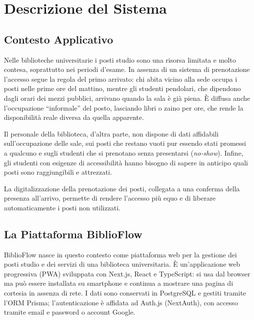 \documentclass[11pt,a4paper,oneside,openany]{book}
\begin{document}
\frontmatter
\copertina
\tableofcontents
\listoffigures

\mainmatter
\chapter{Descrizione del Sistema}

\section{Contesto Applicativo}

Nelle biblioteche universitarie i posti studio sono una risorsa limitata e
molto contesa, soprattutto nei periodi d'esame. In assenza di un sistema di
prenotazione l'accesso segue la regola del primo arrivato: chi abita vicino
alla sede occupa i posti nelle prime ore del mattino, mentre gli studenti
pendolari, che dipendono dagli orari dei mezzi pubblici, arrivano quando la sala
è già piena. È diffusa anche l'occupazione \enquote{informale} del posto,
lasciando libri o zaino per ore, che rende la disponibilità reale diversa da
quella apparente.

Il personale della biblioteca, d'altra parte, non dispone di dati affidabili
sull'occupazione delle sale, sui posti che restano vuoti pur essendo stati
promessi a qualcuno e sugli studenti che si prenotano senza presentarsi
(\emph{no-show}). Infine, gli studenti con esigenze di accessibilità hanno
bisogno di sapere in anticipo quali posti sono raggiungibili e attrezzati.

La digitalizzazione della prenotazione dei posti, collegata a una conferma
della presenza all'arrivo, permette di rendere l'accesso più equo e di liberare
automaticamente i posti non utilizzati.

\section{La Piattaforma BiblioFlow}

BiblioFlow nasce in questo contesto come piattaforma web per la gestione dei
posti studio e dei servizi di una biblioteca universitaria. È un'applicazione
web progressiva (PWA) sviluppata con Next.js, React e TypeScript: si usa dal
browser ma può essere installata su smartphone e continua a mostrare una
pagina di cortesia in assenza di rete. I dati sono conservati in PostgreSQL e
gestiti tramite l'ORM Prisma; l'autenticazione è affidata ad Auth.js
(NextAuth), con accesso tramite email e password o account Google.
\end{document}
